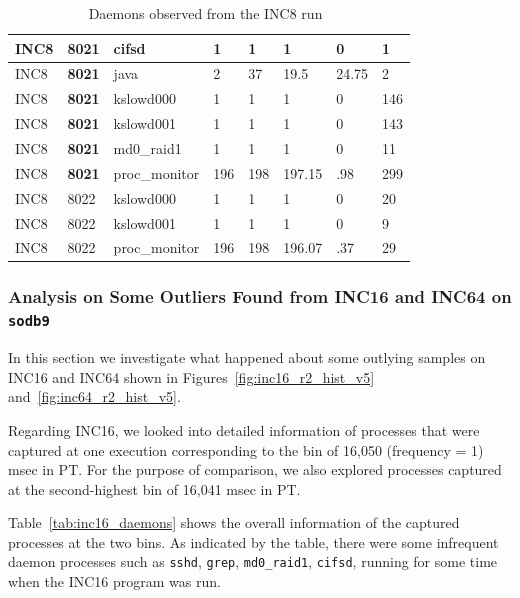 \begin{table}[h]
\begin{center}
{\begin{tabular}{l|l|l|l|l|l|l|l}
INC8     & {\bf 8021}  & cifsd         & 1     & 1     & 1     & 0     & 1\\ \hline
INC8     & {\bf 8021}  & java  & 2     & 37    & 19.5  & 24.75         & 2\\ \hline
INC8     & {\bf 8021}  & kslowd000     & 1     & 1     & 1     & 0     & 146\\ \hline
INC8     & {\bf 8021}  & kslowd001     & 1     & 1     & 1     & 0     & 143\\ \hline
INC8     & {\bf 8021}  & md0\_raid1     & 1     & 1     & 1     & 0     & 11\\ \hline
INC8     & {\bf 8021}  & proc\_monitor  & 196   & 198   & 197.15        & .98   & 299\\ \hline\hline

INC8     & 8022  & kslowd000     & 1     & 1     & 1     & 0     & 20\\ \hline
INC8     & 8022  & kslowd001     & 1     & 1     & 1     & 0     & 9\\ \hline
INC8     & 8022  & proc\_monitor  & 196   & 198   & 196.07        & .37   & 29\\ \hline\hline
\end{tabular}
}
\end{center}
\caption{Daemons observed from the INC8 run~\label{tab:inc8_daemons}}
\end{table}

\clearpage
\newpage

\subsubsection{Analysis on Some Outliers Found from INC16 and INC64 on {\tt sodb9}}
In this section we investigate what happened about some outlying samples on INC16 and INC64 
shown in Figures~\ref{fig:inc16_r2_hist_v5} and~\ref{fig:inc64_r2_hist_v5}.

Regarding INC16, we looked into detailed information of processes that were 
captured at one execution corresponding to the bin of 16,050 (frequency = 1) msec in PT. 
For the purpose of comparison, we also explored processes captured 
at the second-highest bin of 16,041 msec in PT. 

Table~\ref{tab:inc16_daemons} shows the overall information of the captured processes at the two bins. 
As indicated by the table, there were 
some infrequent daemon processes such as {\tt sshd}, {\tt grep}, {\tt md0\_raid1}, {\tt cifsd}, running for some time 
when the INC16 program was run.

